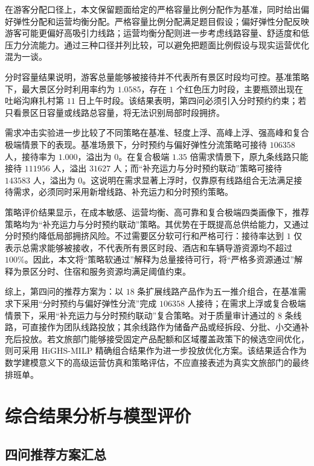 \documentclass[UTF8,zihao=-4,a4paper]{ctexart}
\begin{document}
在游客分配口径上，本文保留题面给定的严格容量比例分配作为基准，同时给出偏好弹性分配和运营均衡分配。严格容量比例分配满足题目假设；偏好弹性分配反映游客可能更偏好高吸引力线路；运营均衡分配则进一步考虑线路容量、舒适度和低压力分流能力。通过三种口径并列比较，可以避免把题面比例假设与现实运营优化混为一谈。

分时容量结果说明，游客总量能够被接待并不代表所有景区时段均可控。基准策略下，最大景区分时利用率约为 $1.0585$，存在 $1$ 个红色压力时段，主要瓶颈出现在吐峪沟麻扎村第 $11$ 日上午时段。该结果表明，第四问必须引入分时预约约束；若只看景区日容量或线路总容量，将无法识别局部时段拥挤。

需求冲击实验进一步比较了不同策略在基准、轻度上浮、高峰上浮、强高峰和复合极端情景下的表现。基准场景下，分时预约与偏好弹性分流策略可接待 $106358$ 人，接待率为 $1.000$，溢出为 $0$。在复合极端 $1.35$ 倍需求情景下，原九条线路只能接待 $111956$ 人，溢出 $31627$ 人；而“补充运力与分时预约联动”策略可接待 $143583$ 人，溢出为 $0$。这说明在需求显著上浮时，仅靠原有线路组合无法满足接待需求，必须同时采用新增线路、补充运力和分时预约策略。

策略评价结果显示，在成本敏感、运营均衡、高可靠和复合极端四类画像下，推荐策略均为“补充运力与分时预约联动”策略。其优势在于既提高总供给能力，又通过分时预约降低局部拥挤风险。不过需要区分软可行和严格可行：接待率达到 $1$ 仅表示总需求能够被接收，不代表所有景区时段、酒店和车辆导游资源均不超过 $100\%$。因此，本文将“策略软通过”解释为总量接待可行，将“严格多资源通过”解释为景区分时、住宿和服务资源均满足阈值约束。

综上，第四问的推荐方案为：以 $18$ 条扩展线路产品作为五一推介组合，在基准需求下采用“分时预约与偏好弹性分流”完成 $106358$ 人接待；在需求上浮或复合极端情景下，采用“补充运力与分时预约联动”复合策略。对于质量审计通过的 $8$ 条线路，可直接作为团队线路投放；其余线路作为储备产品或经拆段、分批、小交通补充后投放。若文旅部门能够接受固定产品配额和区域覆盖政策下的候选空间优化，则可采用 HiGHS-MILP 精确组合结果作为进一步投放优化方案。该结果适合作为数学建模意义下的高级运营仿真和策略评估，不应直接表述为真实文旅部门的最终排班单。

\clearpage

\section{综合结果分析与模型评价}
\label{sec:result_analysis}

\subsection{四问推荐方案汇总}
\label{subsec:summary_recommendations}
\end{document}
